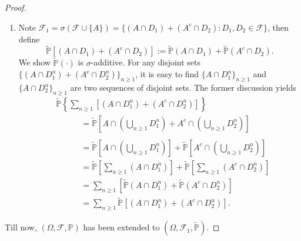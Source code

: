 \documentclass[12pt]{article}
\renewcommand{\(}{\left(}%
\renewcommand{\)}{\right)}%
\renewcommand{\[}{\left[}%
\renewcommand{\]}{\right]}%
\newcommand{\p}{\mathbb{P}}
\newcommand{\f}{\mathscr{F}}
\newtheorem{proof}{Proof.}}
\begin{document}
\begin{proof}
\begin{enumerate}
   	 \begin{equation*}
   	 	\widetilde{\p}[A^c\cap (D_1\cup D_2)]=\widetilde{\p}(A^c\cap D_1)+\widetilde{\p}(A^c\cap D_2).
   	 \end{equation*} 
   	 And similar argument shows for any disjoint $\{A^c\cap D_n\}_{n\geq 1}$, we have
   	 \begin{equation*}
   			\widetilde{\p}\(\sum_{n\geq 1}A^c\cap D_n\)=\sum_{n\geq 1}\widetilde{\p}(A^c\cap D _n).
   		\end{equation*}
   	\item Note $\f_1=\sigma(\f\cup\{A\})=\{(A\cap D_1)+ (A^c\cap D_2):D_1,D_2\in\f\}$, then define
   	 \begin{equation*}
   	 	\widetilde{\p}[(A\cap D_1)+ (A^c\cap D_2)]:=\widetilde{\p}(A\cap D_1)+\widetilde{\p}(A^c\cap D_2).
   	 \end{equation*}
   	 We show $\widetilde{\p}(\cdot)$ is $\sigma$-additive. For any disjoint sets $\{(A\cap D_1^n)+ (A^c\cap D_2^n)\}_{n\geq 1}$, it is easy to find $\{A\cap D_1^n\}_{n\geq 1}$ and $\{A\cap D_2^n\}_{n\geq 1}$ are two sequences of disjoint sets. The former discussion yields
   	 \begin{equation*}
   	 	\begin{split}
   	 		&\widetilde{\p}\left\{\sum_{n\geq 1}\[(A\cap D_1^n)+ (A^c\cap D_2^n)\]\right\}\\
   	 		&\qquad\quad =\widetilde{\p}\[A\cap\(\bigcup_{n\geq 1} D_1^n\)+ A^c\cap\(\bigcup_{n\geq 1} D_2^n\) \]\\\\
   	 		&\qquad\quad =\widetilde{\p}\[A\cap\(\bigcup_{n\geq 1} D_1^n\)\]+\widetilde{\p}\[ A^c\cap\(\bigcup_{n\geq 1} D_2^n\) \]\\
   	 		&\qquad\quad = \widetilde{\p}\[\sum_{n\geq 1}(A\cap D_1^n)\]+\widetilde{\p}\[\sum_{n\geq 1}(A^c\cap D_2^n) \]\\
   	 		&\qquad\quad =\sum_{n\geq 1}[\widetilde{\p} (A\cap D_1^n)+\widetilde{\p}(A^c\cap D_2^n)]\\
   	 		&\qquad\quad =\sum_{n\geq 1}\widetilde{\p}\[(A\cap D_1^n)+ (A^c\cap D_2^n)\].
   	 	\end{split}
   	 \end{equation*}
   	\end{enumerate}
   	Till now, $(\Omega,\f,\p)$ has been extended to $(\Omega,\f_1,\widetilde{\p})$.
   \end{proof}
   
\end{document}
